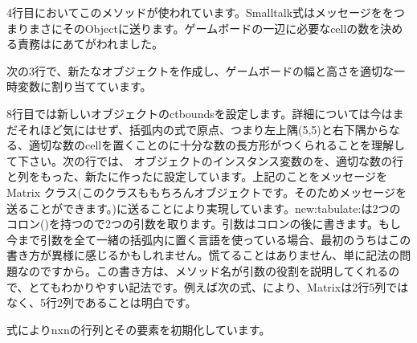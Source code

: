 \documentclass[a4paper,10pt,twoside]{book}
\begin{document}
 
4行目においてこのメソッドが使われています。Smalltalk式はメッセージををつまりまさにそのObjectに送ります。ゲームボードの一辺に必要なcellの数を決める責務はにあてがわれました。

次の3行で、新たなオブジェクトを作成し、ゲームボードの幅と高さを適切な一時変数に割り当てています。 

8行目では新しいオブジェクトのct{bounds}を設定します。詳細については今はまだそれほど気にはせず、括弧内の式で原点、つまり左上隅(5,5)と右下隅からなる、適切な数のcellを置くことのに十分な数の長方形がつくられることを理解して下さい。次の行では、 オブジェクトのインスタンス変数のを、適切な数の行と列をもった、新たに作ったに設定しています。上記のことをメッセージを Matrix クラス(このクラスももちろんオブジェクトです。そのためメッセージを送ることができます。)に送ることにより実現しています。new:tabulate:は2つのコロン(\ct{:})を持つので2つの引数を取ります。引数はコロンの後に書きます。もし今まで引数を全て一緒の括弧内に置く言語を使っている場合、最初のうちはこの書き方が異様に感じるかもしれません。慌てることはありません、単に記法の問題なのですから。この書き方は、メソッド名が引数の役割を説明してくれるので、とてもわかりやすい記法です。例えば次の式、により、Matrixは2行5列ではなく、5行2列であることは明白です。

式によりnxnの行列とその要素を初期化しています。 



\end{document}

